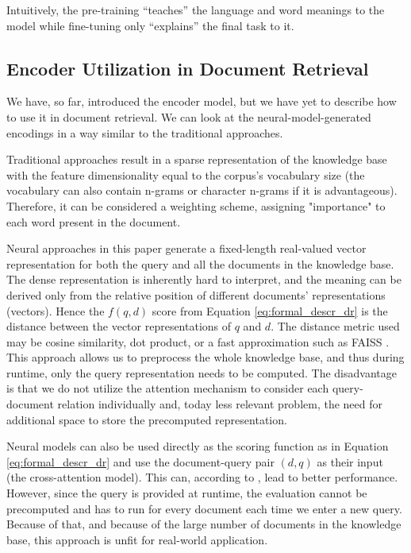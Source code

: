 Intuitively, the pre-training ``teaches'' the language and word meanings to the model while fine-tuning only ``explains'' the final task to it.

\subsection{Encoder Utilization in Document Retrieval}

We have, so far, introduced the encoder model, but we have yet to describe how to use it in document retrieval. We can look at the neural-model-generated encodings in a way similar to the traditional approaches.

Traditional approaches result in a sparse representation of the knowledge base with the feature dimensionality equal to the corpus's vocabulary size (the vocabulary can also contain n-grams or character n-grams if it is advantageous).
Therefore, it can be considered a weighting scheme, assigning "importance" to each word present in the document. 

Neural approaches in this paper generate a fixed-length real-valued vector representation for both the query and all the documents in the knowledge base.
The dense representation is inherently hard to interpret, and the meaning can be derived only from the relative position of different documents' representations (vectors).
Hence the $f(q,d)$ score from Equation \ref{eq:formal_descr_dr} is the distance between the vector representations of $q$ and $d$.
The distance metric used may be cosine similarity, dot product, or a fast approximation such as FAISS \citep{faiss}.
This approach allows us to preprocess the whole knowledge base, and thus during runtime, only the query representation needs to be computed.
The disadvantage is that we do not utilize the attention mechanism to consider each query-document relation individually and, today less relevant problem, the need for additional space to store the precomputed representation.

Neural models can also be used directly as the scoring function as in Equation \ref{eq:formal_descr_dr} and use the document-query pair $(d,q)$ as their input (the cross-attention model).
This can, according to \citet{two-tower}, lead to better performance. However, since the query is provided at runtime, the evaluation cannot be precomputed and has to run for every document each time we enter a new query.
Because of that, and because of the large number of documents in the knowledge base, this approach is unfit for real-world application.

